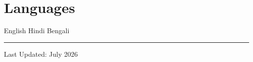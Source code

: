 \documentclass[10pt,a4paper]{article}
\begin{document}

\section*{Languages}

English \hspace{12pt}
Hindi \hspace{12pt}
Bengali


\vspace{6pt}

\begin{center}

\rule{0.45\linewidth}{0.4pt}

\vspace{2pt}

{\small
Last Updated: July 2026
}

\end{center}

\end{document}
